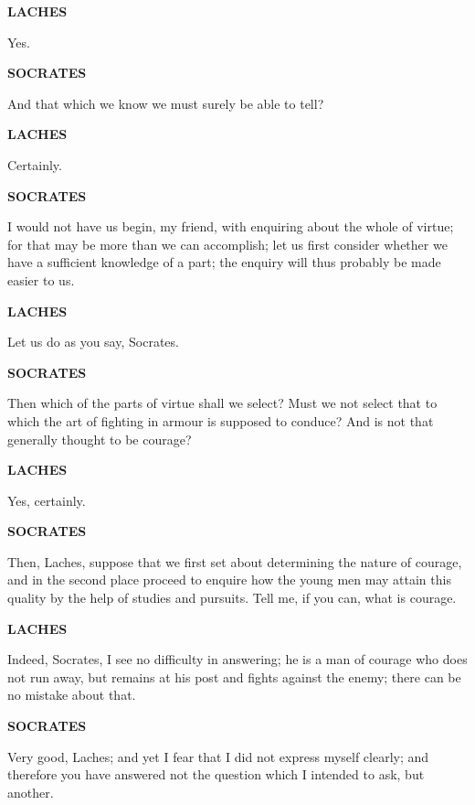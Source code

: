 \documentclass[11pt,letter]{book}
\begin{document}
\par \textbf{LACHES}
\par   Yes.

\par \textbf{SOCRATES}
\par   And that which we know we must surely be able to tell?

\par \textbf{LACHES}
\par   Certainly.

\par \textbf{SOCRATES}
\par   I would not have us begin, my friend, with enquiring about the whole of virtue; for that may be more than we can accomplish; let us first consider whether we have a sufficient knowledge of a part; the enquiry will thus probably be made easier to us.

\par \textbf{LACHES}
\par   Let us do as you say, Socrates.

\par \textbf{SOCRATES}
\par   Then which of the parts of virtue shall we select? Must we not select that to which the art of fighting in armour is supposed to conduce? And is not that generally thought to be courage?

\par \textbf{LACHES}
\par   Yes, certainly.

\par \textbf{SOCRATES}
\par   Then, Laches, suppose that we first set about determining the nature of courage, and in the second place proceed to enquire how the young men may attain this quality by the help of studies and pursuits. Tell me, if you can, what is courage.

\par \textbf{LACHES}
\par   Indeed, Socrates, I see no difficulty in answering; he is a man of courage who does not run away, but remains at his post and fights against the enemy; there can be no mistake about that.

\par \textbf{SOCRATES}
\par   Very good, Laches; and yet I fear that I did not express myself clearly; and therefore you have answered not the question which I intended to ask, but another.
\end{document}
